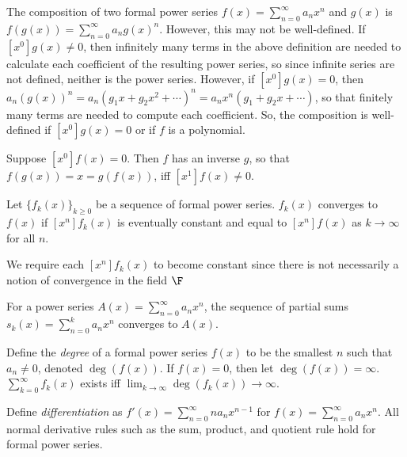\documentclass[a4paper]{article}
\begin{document}
\begin{definition}
The composition of two formal power series $f(x)=\sum_{n=0}^\infty a_nx^n$ and $g(x)$ is $f(g(x))=\sum_{n=0}^\infty a_n g(x)^n$. However, this may not be well-defined. If $[x^0]g(x)\neq0$, then infinitely many terms in the above definition are needed to calculate each coefficient of the resulting power series, so since infinite series are not defined, neither is the power series. However, if $[x^0]g(x)=0$, then $a_n(g(x))^n=a_n(g_1x+g_2x^2+\cdots)^n=a_nx^n(g_1+g_2x+\cdots)$, so that finitely many terms are needed to compute each coefficient. So, the composition is well-defined if $[x^0]g(x)=0$ or if $f$ is a polynomial.
\end{definition}

\begin{proposition}
Suppose $[x^0]f(x)=0$. Then $f$ has an inverse $g$, so that $f(g(x))=x=g(f(x))$, iff $[x^1]f(x)\neq0$.
\end{proposition}

\begin{definition}
Let $\{f_k(x)\}_{k\geq0}$ be a sequence of formal power series. $f_k(x)$ converges to $f(x)$ if $[x^n]f_k(x)$ is eventually constant and equal to $[x^n]f(x)$ as $k\rightarrow\infty$ for all $n$.
\begin{arrows}
\item We require each $[x^n]f_k(x)$ to become constant since there is not necessarily a notion of convergence in the field $\F$
\end{arrows}
\end{definition}

\begin{example}
For a power series $A(x)=\sum_{n=0}^\infty a_nx^n$, the sequence of partial sums $s_k(x)=\sum_{n=0}^ka_nx^n$ converges to $A(x)$.
\end{example}

\begin{proposition}
Define the \emph{degree} of a formal power series $f(x)$ to be the smallest $n$ such that $a_n\neq0$, denoted $\deg(f(x))$. If $f(x)=0$, then let $\deg(f(x))=\infty$. $\sum_{k=0}^\infty f_k(x)$ exists iff $\lim_{k\rightarrow\infty}\deg(f_k(x))\rightarrow\infty$.
\end{proposition}

\begin{proposition}
Define \emph{differentiation} as $f'(x)=\sum_{n=0}^\infty na_nx^{n-1}$ for $f(x)=\sum_{n=0}^\infty a_nx^n$. All normal derivative rules such as the sum, product, and quotient rule hold for formal power series.
\end{proposition}
\end{document}
